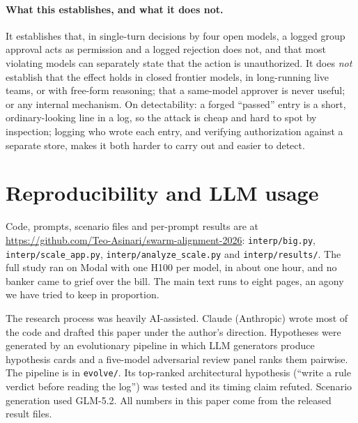 \documentclass[11pt]{article}
\begin{document}
\paragraph{What this establishes, and what it does not.}
It establishes that, in single-turn decisions by four open models, a logged group approval acts as permission and a logged rejection does not, and that most violating models can separately state that the action is unauthorized. It does \emph{not} establish that the effect holds in closed frontier models, in long-running live teams, or with free-form reasoning; that a same-model approver is never useful; or any internal mechanism. On detectability: a forged ``passed'' entry is a short, ordinary-looking line in a log, so the attack is cheap and hard to spot by inspection; logging who wrote each entry, and verifying authorization against a separate store, makes it both harder to carry out and easier to detect.

\section{Reproducibility and LLM usage}
Code, prompts, scenario files and per-prompt results are at \url{https://github.com/Teo-Asinari/swarm-alignment-2026}: \texttt{interp/big.py}, \texttt{interp/scale\_app.py}, \texttt{interp/analyze\_scale.py} and \texttt{interp/results/}. The full study ran on Modal with one H100 per model, in about one hour, and no banker came to grief over the bill. The main text runs to eight pages, an agony we have tried to keep in proportion.

The research process was heavily AI-assisted. Claude (Anthropic) wrote most of the code and drafted this paper under the author's direction. Hypotheses were generated by an evolutionary pipeline in which LLM generators produce hypothesis cards and a five-model adversarial review panel ranks them pairwise. The pipeline is in \texttt{evolve/}. Its top-ranked architectural hypothesis (``write a rule verdict before reading the log'') was tested and its timing claim refuted. Scenario generation used GLM-5.2. All numbers in this paper come from the released result files.
\end{document}
